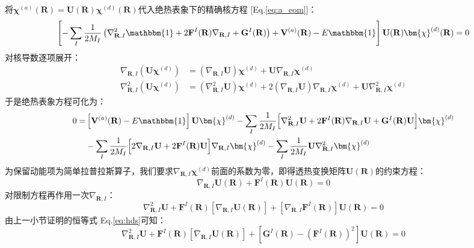 将$\bm{\chi}^{(a)}(\mathbf{R})=\mathbf{U}(\mathbf{R})\bm{\chi}^{(d)}(\mathbf{R})$代入绝热表象下的精确核方程 [Eq.\eqref{eq:a_eom}]：
\[\left[-\sum_I\frac{1}{2M_I}\left(\nabla_{\mathbf{R},I}^2\mathbbm{1}+2\mathbf{F}^{I}(\mathbf{R})\nabla_{\mathbf{R},I}+\mathbf{G}^{I}(\mathbf{R})\right)+\mathbf{V}^{(a)}(\mathbf{R})-E\mathbbm{1}\right]\mathbf{U}(\mathbf{R})\bm{\chi}^{(d)}(\mathbf{R})=0\]
对核导数逐项展开：
\[\begin{aligned}
\nabla_{\mathbf{R},I}\left(\mathbf{U}\bm{\chi}^{(d)}\right)&=\left(\nabla_{\mathbf{R},I}\mathbf{U}\right)\bm{\chi}^{(d)}+\mathbf{U}\nabla_{\mathbf{R},I}\bm{\chi}^{(d)}\\
\nabla_{\mathbf{R},I}^2\left(\mathbf{U}\bm{\chi}^{(d)}\right)&=\left(\nabla_{\mathbf{R},I}^2\mathbf{U}\right)\bm{\chi}^{(d)}+2\left(\nabla_{\mathbf{R},I}\mathbf{U}\right)\nabla_{\mathbf{R},I}\bm{\chi}^{(d)}+\mathbf{U}\nabla_{\mathbf{R},I}^2\bm{\chi}^{(d)}
\end{aligned}\]
于是绝热表象方程可化为：
\begin{equation}\label{eq:d_emo_temp}
\begin{aligned}
0=&\left[\mathbf{V}^{(a)}(\mathbf{R})-E\mathbbm{1}\right]\mathbf{U}\bm{\chi}^{(d)}-\sum_I\frac{1}{2M_I}\Big[\nabla_{\mathbf{R},I}^2\mathbf{U}+2\mathbf{F}^{I}(\mathbf{R})\nabla_{\mathbf{R},I}\mathbf{U}+\mathbf{G}^{I}(\mathbf{R})\mathbf{U}\Big]\bm{\chi}^{(d)}\\
&-\sum_I\frac{1}{2M_I}\Big[2\nabla_{\mathbf{R},I}\mathbf{U}+2\mathbf{F}^{I}(\mathbf{R})\mathbf{U}\Big]\nabla_{\mathbf{R},I}\bm{\chi}^{(d)}-\sum_I\frac{1}{2M_I}\mathbf{U}\nabla_{\mathbf{R},I}^2\bm{\chi}^{(d)}
\end{aligned}
\end{equation}
为保留动能项为简单拉普拉斯算子，我们要求$\nabla_{\mathbf{R},I}\bm{\chi}^{(d)}$前面的系数为零，即得透热变换矩阵$\mathbf{U}(\mathbf{R})$的约束方程：
\begin{equation}\label{eq:ysfc}
\nabla_{\mathbf{R},I}\mathbf{U}(\mathbf{R})+\mathbf{F}^{I}(\mathbf{R})\mathbf{U}(\mathbf{R})=0
\end{equation}
对限制方程再作用一次$\nabla_{\mathbf{R},I}$：
\begin{equation}\label{eq:nabla_ysfc}
\nabla_{\mathbf{R},I}^2\mathbf{U}+\mathbf{F}^{I}(\mathbf{R})\left[\nabla_{\mathbf{R},I}\mathbf{U}(\mathbf{R})\right]+\left[\nabla_{\mathbf{R},I}\mathbf{F}^{I}(\mathbf{R})\right]\mathbf{U}(\mathbf{R})=0
\end{equation}
由上一小节证明的恒等式 Eq.\eqref{eq:hds}可知：
\[\nabla_{\mathbf{R},I}^2\mathbf{U}+\mathbf{F}^{I}(\mathbf{R})\left[\nabla_{\mathbf{R},I}\mathbf{U}(\mathbf{R})\right]+\left[\mathbf{G}^{I}(\mathbf{R})-\left(\mathbf{F}^{I}(\mathbf{R})\right)^2\right]\mathbf{U}(\mathbf{R})=0\]
